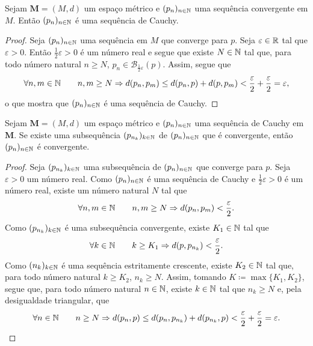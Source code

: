 \begin{prop}
	Sejam $\bm M = (M,d)$ um espaço métrico e $(p_n)_{n \in \mathbb{N}}$ uma sequência convergente em $M$. Então $(p_n)_{n \in \mathbb{N}}$ é uma sequência de Cauchy.
\end{prop}
\begin{proof}
	Seja $(p_n)_{n \in \mathbb{N}}$ uma sequência em $M$ que converge para $p$. Seja $\varepsilon \in \mathbb{R}$ tal que $\varepsilon > 0$. Então $\frac{1}{2}\varepsilon > 0$ é um número real e segue que existe $N \in \mathbb{N}$ tal que, para todo número natural $n \geq N$, $p_n \in \mathcal B_{\frac{1}{2}\varepsilon}(p)$. Assim, segue que	
	\begin{equation*}
	\forall n,m \in \mathbb{N} \qquad n,m \geq N \Rightarrow d(p_n,p_m) \leq d(p_n,p) + d(p,p_m) < \frac{\varepsilon}{2} + \frac{\varepsilon}{2} = \varepsilon,
	\end{equation*}
o que mostra que $(p_n)_{n \in \mathbb{N}}$ é uma sequência de Cauchy.
\end{proof}

\begin{prop}
	Sejam $\bm M = (M,d)$ um espaço métrico e $(p_n)_{n \in \mathbb{N}}$ uma sequência de Cauchy em $\bm M$. Se existe uma subsequência $(p_{n_k})_{k \in \mathbb{N}}$ de $(p_n)_{n \in \mathbb{N}}$ que é convergente, então $(p_n)_{n \in \mathbb{N}}$ é convergente.
\end{prop}
\begin{proof}
	Seja $(p_{n_k})_{k \in \mathbb{N}}$ uma subsequência de $(p_n)_{n \in \mathbb{N}}$ que converge  para $p$. Seja $\varepsilon > 0$ um número real. Como $(p_n)_{n \in \mathbb{N}}$ é uma sequência de Cauchy e $\frac{1}{2}\varepsilon > 0$ é um número real, existe um número natural $N$ tal que
	\begin{equation*}
	\forall n,m \in \mathbb{N} \qquad n,m \geq N \Rightarrow d(p_n,p_m) < \frac{\varepsilon}{2}.
	\end{equation*}
Como $(p_{n_k})_{k \in \mathbb{N}}$ é uma subsequência convergente, existe $K_1 \in \mathbb{N}$ tal que
	\begin{equation*}
	\forall k \in \mathbb{N} \qquad k \geq K_1 \Rightarrow d(p,p_{n_k}) < \frac{\varepsilon}{2}.
	\end{equation*}
Como $(n_k)_{k \in \mathbb{N}}$ é uma sequência estritamente crescente, existe $K_2 \in \mathbb{N}$ tal que, para todo número natural $k \geq K_2$, $n_k \geq N$. Assim, tomando $K \coloneqq \max\{K_1,K_2\}$, segue que, para todo número natural $n \in \mathbb{N}$, existe $k \in \mathbb{N}$ tal que $n_k \geq N$ e,  pela desigualdade triangular, que
	\begin{equation*}
	\forall n \in \mathbb{N} \qquad n \geq N \Rightarrow d(p_n,p) \leq d(p_n,p_{n_k}) + d(p_{n_k},p) < \frac{\varepsilon}{2}+\frac{\varepsilon}{2}=\varepsilon.
	\end{equation*}
\end{proof}


